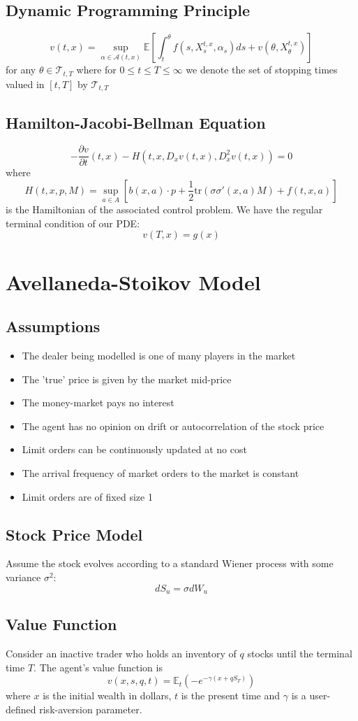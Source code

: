\documentclass{article}
\begin{document}
\subsection{Dynamic Programming Principle}
$$v(t,x)=\sup\limits_{\alpha\in\mathcal{A}(t,x)}\mathbb{E}\left[\int_t^\theta f(s,X_s^{t,x},\alpha_s)ds+v(\theta,X_\theta^{t,x})\right]$$
for any $\theta\in\mathcal{T}_{t,T}$ where for $0\leq t\leq T\leq\infty$ we denote the set of stopping times valued in $[t,T]$ by $\mathcal{T}_{t,T}$
\subsection{Hamilton-Jacobi-Bellman Equation}
$$-\frac{\partial v}{\partial t}(t,x)-H(t,x,D_xv(t,x),D^2_xv(t,x))=0$$
where
$$H(t,x,p,M)=\sup\limits_{a\in A}\left[b(x,a)\cdot p+\frac{1}{2}\textrm{tr}(\sigma\sigma'(x,a)M)+f(t,x,a)\right]$$
is the Hamiltonian of the associated control problem. We have the regular terminal condition of our PDE:
$$v(T,x)=g(x)$$
\newpage
\section{Avellaneda-Stoikov Model}
\subsection{Assumptions}
\begin{itemize}
    \item The dealer being modelled is one of many players in the market
    \item The 'true' price is given by the market mid-price
    \item The money-market pays no interest
    \item The agent has no opinion on drift or autocorrelation of the stock price
    \item Limit orders can be continuously updated at no cost
    \item The arrival frequency of market orders to the market is constant
    \item Limit orders are of fixed size 1
\end{itemize}
\subsection{Stock Price Model}
Assume the stock evolves according to a standard Wiener process with some variance $\sigma^2$: 
$$dS_u=\sigma dW_u$$
\subsection{Value Function}
Consider an inactive trader who holds an inventory of $q$ stocks until the terminal time $T.$ The agent's value function is
$$v(x,s,q,t)=\mathbb{E}_t\left(-e^{-\gamma(x+qS_T)}\right)$$
where $x$ is the initial wealth in dollars, $t$ is the present time and $\gamma$ is a user-defined risk-aversion parameter.
\end{document}

